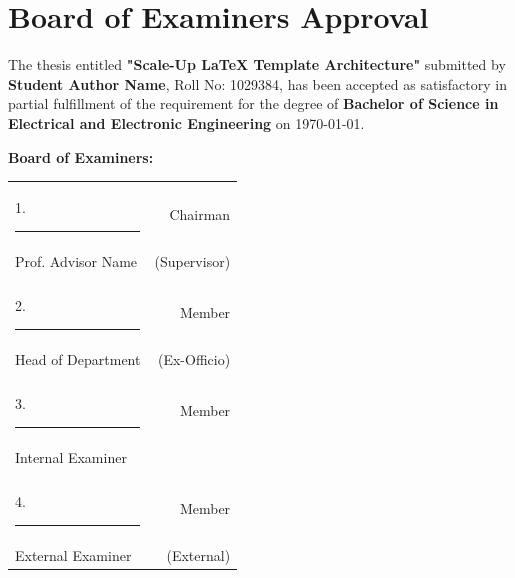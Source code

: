 \chapter*{Board of Examiners Approval}
The thesis entitled \textbf{"Scale-Up LaTeX Template Architecture"} submitted by \textbf{Student Author Name}, Roll No: 1029384, has been accepted as satisfactory in partial fulfillment of the requirement for the degree of \textbf{Bachelor of Science in Electrical and Electronic Engineering} on \today.

\vspace{1.5cm}
\noindent
\textbf{Board of Examiners:}

\vspace{1cm}
\noindent
\begin{tabular*}{\textwidth}{@{\extracolsep{\fill}}lr}
    1. \rule{6cm}{0.5pt} & Chairman \\
    Prof. Advisor Name & (Supervisor) \\
    \\
    2. \rule{6cm}{0.5pt} & Member \\
    Head of Department & (Ex-Officio) \\
    \\
    3. \rule{6cm}{0.5pt} & Member \\
    Internal Examiner & \\
    \\
    4. \rule{6cm}{0.5pt} & Member \\
    External Examiner & (External)
\end{tabular*}

